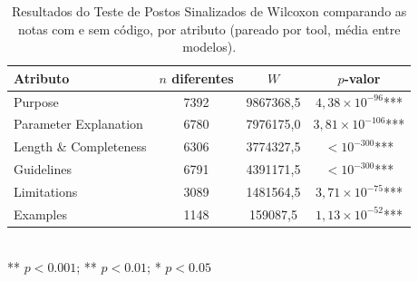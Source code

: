 \begin{table}[H]
\centering
\caption{Resultados do Teste de Postos Sinalizados de Wilcoxon comparando as notas com e sem código, por atributo (pareado por tool, média entre modelos).}
\label{tab:wilcoxon}
\begin{tabular}{lccc}
\toprule
Atributo & $n$ diferentes & $W$ & $p$-valor \\
\midrule
Purpose & 7392 & 9867368,5 & $4,38 \times 10^{-96}$*** \\
Parameter Explanation & 6780 & 7976175,0 & $3,81 \times 10^{-106}$*** \\
Length \& Completeness & 6306 & 3774327,5 & $< 10^{-300}$*** \\
Guidelines & 6791 & 4391171,5 & $< 10^{-300}$*** \\
Limitations & 3089 & 1481564,5 & $3,71 \times 10^{-75}$*** \\
Examples & 1148 & 159087,5 & $1,13 \times 10^{-52}$*** \\
\bottomrule
\end{tabular}
\\[4pt]
{\footnotesize *** $p<0.001$;\; ** $p<0.01$;\; * $p<0.05$}
\end{table}
